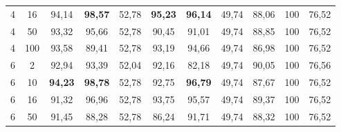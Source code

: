\begin{table}[ht]
\begin{tabular}{cc|ccc|ccc|ccc}
        {4}                           & {16}    & {94,14}                             & {\textbf{98,57}}                    & {52,78}                                   & {\textbf{95,23}}                & \textbf{96,14}                  & {49,74}                        & {88,06}                         & {100}                           & {76,52}                        \\
        {4}                           & {50}    & {93,32}                             & {95,66}                             & {52,78}                                   & {90,45}                         & {91,01}                         & {49,74}                        & {88,85}                         & {100}                           & {76,52}                        \\
        {4}                           & {100}   & {93,58}                             & {89,41}                             & {52,78}                                   & {93,19}                         & {94,66}                         & {49,74}                        & {86,98}                         & {100}                           & {76,52}                        \\
        {6}                           & {2}     & {92,94}                             & {93,39}                             & {52,04}                                   & {92,16}                         & {82,18}                         & {49,74}                        & {90,05}                         & {100}                           & {76,56}                        \\
        {6}                           & {10}    & {\textbf{94,23}}                    & {\textbf{98,78}}                    & {52,78}                                   & {92,75}                         & \textbf{96,79}                  & {49,74}                        & {87,67}                         & {100}                           & {76,52}                        \\
        {6}                           & {16}    & {91,32}                             & {96,96}                             & {52,78}                                   & {93,75}                         & {95,57}                         & {49,74}                        & {89,37}                         & {100}                           & {76,52}                        \\
        {6}                           & {50}    & {91,45}                             & {88,28}                             & {52,78}                                   & {86,24}                         & {91,71}                         & {49,74}                        & {88,32}                         & {100}                           & {76,52}                        \\

\end{tabular}
\end{table}
